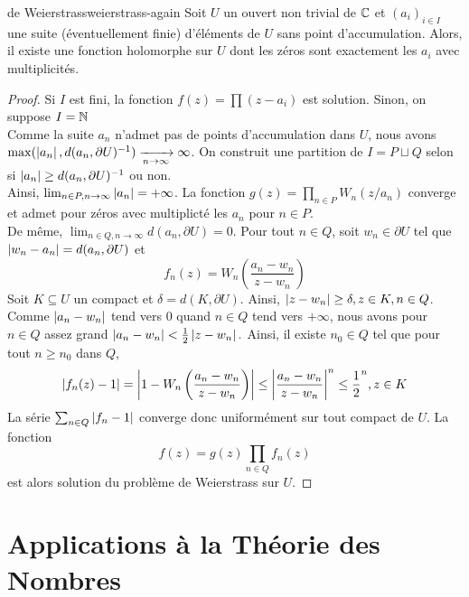 \documentclass{cours}
\begin{document}
\begin{théorème}
	{de Weierstrass}{weierstrass-again}
	Soit $U$ un ouvert non trivial de $\mathbb{C}$ et $(a_{i})_{i\in I}$ une suite (éventuellement finie) d'éléments de $U$ sans point d'accumulation. 
	Alors, il existe une fonction holomorphe sur $U$ dont les zéros sont exactement les $a_{i}$ avec multiplicités. 
\end{théorème}
\begin{proof}
	Si $I$ est fini, la fonction $f(z) = \prod (z - a_{i})$ est solution. Sinon, on suppose $I = \mathbb{N}$\\
	Comme la suite $a_{n}$ n'admet pas de points d'accumulation dans $U$, nous avons $\max(\left|a_{n}\right|, d(a_{n}, \partial U)^{-1}) \xrightarrow[n \to \infty]{} \infty$. 
	On construit une partition de $I = P \sqcup Q$ selon si $\left|a_{n}\right| \geq d(a_{n}, \partial U)^{-1}$ ou non.\\ 
	Ainsi, $\lim_{n \in P, n \to \infty} \left|a_{n}\right| = + \infty$. 
	La fonction $g(z) = \prod_{n \in P} W_{n}(z/a_{n})$ converge et admet pour zéros avec multiplicté les $a_{n}$ pour $n \in P$. \\
	De même, $\lim_{n \in Q, n\to \infty}d(a_{n}, \partial U) = 0$. Pour tout $n \in Q$, soit $w_{n} \in\partial U$ tel que $\left|w_{n} - a_{n}\right| = d(a_{n}, \partial U)$ et 
		\begin{equation*}
			f_{n}(z) = W_{n}\left(\frac{a_{n} - w_{n}}{z - w_{n}}\right)
		\end{equation*}
	Soit $K \subseteq U$ un compact et $\delta = d(K, \partial U)$. Ainsi, $\left|z - w_{n}\right| \geq \delta, z \in K, n \in Q$. Comme $\left|a_{n} - w_{n}\right|$ tend vers $0$ quand $n \in Q$ tend vers $+ \infty$, nous avons pour $n \in Q$ assez grand $\left|a_{n} - w_{n}\right| < \frac{1}{2}\left|z - w_{n}\right|.$ Ainsi, il existe $n_{0} \in Q$ tel que pour tout $n \geq n_{0}$ dans $Q$, 
	\begin{equation*}
		\left|f_{n}(z) - 1\right| = \left|1 - W_{n}\left(\frac{a_{n} - w_{n}}{z - w_{n}}\right)\right| \leq \left|\frac{a_{n} - w_{n}}{z - w_{n}}\right|^{n} \leq \frac{1}{2}^{n}, z \in K
	\end{equation*}
	La série $\sum_{n \in Q} \left|f_{n} - 1\right|$ converge donc uniformément sur tout compact de $U$. La fonction 
	\begin{equation*}
		f(z) = g(z) \prod_{n \in Q}f_{n}(z)	
	\end{equation*}
	 est alors solution du problème de Weierstrass sur $U$. 
\end{proof}

\part{Applications à la Théorie des Nombres}
\end{document}
